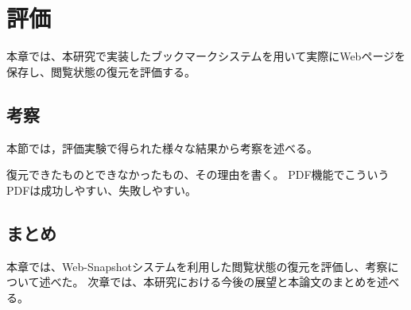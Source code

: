 \chapter{評価}
\label{chap:evaluation}
本章では、本研究で実装したブックマークシステムを用いて実際にWebページを保存し、閲覧状態の復元を評価する。




\section{考察}
本節では，評価実験で得られた様々な結果から考察を述べる。

復元できたものとできなかったもの、その理由を書く。
PDF機能でこういうPDFは成功しやすい、失敗しやすい。

\section{まとめ}
本章では、Web-Snapshotシステムを利用した閲覧状態の復元を評価し、考察について述べた。
次章では、本研究における今後の展望と本論文のまとめを述べる。